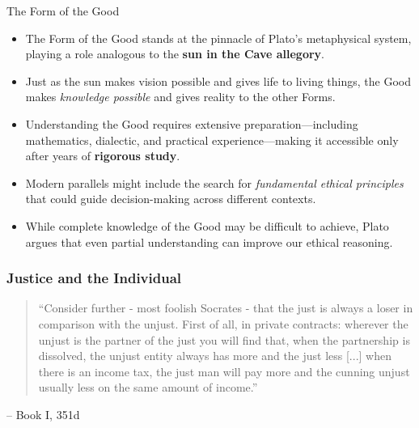 \documentclass[aspectratio=169]{beamer}
\begin{document}
\begin{frame}{The Form of the Good}
\begin{itemize}
\item The Form of the Good stands at the pinnacle of Plato's metaphysical system, playing a role analogous to the \textbf{sun in the Cave allegory}.
\item Just as the sun makes vision possible and gives life to living things, the Good makes \emph{knowledge possible} and gives reality to the other Forms.
\item Understanding the Good requires extensive preparation—including mathematics, dialectic, and practical experience—making it accessible only after years of \textbf{rigorous study}.
\item Modern parallels might include the search for \emph{fundamental ethical principles} that could guide decision-making across different contexts.
\item While complete knowledge of the Good may be difficult to achieve, Plato argues that even partial understanding can improve our ethical reasoning.
\end{itemize}
\end{frame}

\begin{frame}
    \frametitle{Justice and the Individual}
    \begin{quotation}
    ``Consider further - most foolish Socrates - that the just is always a loser in comparison with the unjust. First of all, in private contracts: wherever the unjust is the partner of the just you will find that, when the partnership is dissolved, the unjust entity always has more and the just less [...] when there is an income tax, the just man will pay more and the cunning unjust usually less on the same amount of income.''
    \end{quotation}
    \vspace{0.5cm}
    \small{-- Book I, 351d}
\end{frame}
\end{document}
